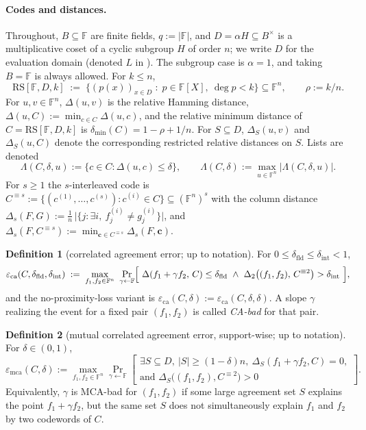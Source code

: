 \documentclass[11pt]{article}
\theoremstyle{definition}
\newtheorem{definition}[definition]{Definition}
\theoremstyle{remark}
\newcommand{\F}{\mathbb{F}}
\newcommand{\B}{B}
\newcommand{\RS}{\mathrm{RS}}
\newcommand{\eca}{\varepsilon_{\mathrm{ca}}}
\newcommand{\emca}{\varepsilon_{\mathrm{mca}}}
\newcommand{\dmin}{\delta_{\min}}
\newcommand{\dist}{\Delta}
\newcommand{\distS}{\Delta_S}
\newcommand{\Lst}{\Lambda}
\begin{document}
\paragraph{Codes and distances.} Throughout, $\B\subseteq\F$ are finite fields, $q:=|\F|$, and $D=\alpha H\subseteq\B^\times$ is a multiplicative coset of a cyclic subgroup $H$ of order $n$; we write $D$ for the evaluation domain (denoted $L$ in \cite{ABF26}). The subgroup case is $\alpha=1$, and taking $\B=\F$ is always allowed. For $k\le n$,
\[
\RS[\F,D,k]\;:=\;\bigl\{(p(x))_{x\in D}\;:\;p\in\F[X],\ \deg p<k\bigr\}\subseteq\F^n,
\qquad \rho:=k/n .
\]
For $u,v\in\F^n$, $\dist(u,v)$ is the relative Hamming distance, $\dist(u,C):=\min_{c\in C}\dist(u,c)$, and the relative minimum distance of $C=\RS[\F,D,k]$ is $\dmin(C)=1-\rho+1/n$. For $S\subseteq D$, $\distS(u,v)$ and $\distS(u,C)$ denote the corresponding restricted relative distances on $S$. Lists are denoted
\[
\Lst(C,\delta,u):=\{c\in C:\dist(u,c)\le\delta\},\qquad \Lst(C,\delta):=\max_{u\in\F^n}|\Lst(C,\delta,u)| .
\]
For $s\ge1$ the $s$-interleaved code is $C^{\equiv s}:=\{(c^{(1)},\dots,c^{(s)}):c^{(i)}\in C\}\subseteq(\F^n)^s$ with the column distance $\dist_s(F,G):=\frac1n\,\bigl|\{j:\exists i,\ f^{(i)}_j\ne g^{(i)}_j\}\bigr|$, and $\dist_s(F,C^{\equiv s}):=\min_{\mathbf c\in C^{\equiv s}}\dist_s(F,\mathbf c)$.

\begin{definition}[correlated agreement error; {\cite[Def.~4.1]{ABF26}} up to notation]\label{def:ca}
For $0\le\delta_{\mathrm{fld}}\le\delta_{\mathrm{int}}<1$,
\[
\eca(C,\delta_{\mathrm{fld}},\delta_{\mathrm{int}})\;:=\;\max_{f_1,f_2\in\F^n}\ \Pr_{\gamma\leftarrow\F}\Bigl[\ \dist(f_1+\gamma f_2,\,C)\le\delta_{\mathrm{fld}}\ \wedge\ \dist_2\bigl((f_1,f_2),\,C^{\equiv2}\bigr)>\delta_{\mathrm{int}}\ \Bigr],
\]
and the no-proximity-loss variant is $\eca(C,\delta):=\eca(C,\delta,\delta)$. A slope $\gamma$ realizing the event for a fixed pair $(f_1,f_2)$ is called \emph{CA-bad} for that pair.
\end{definition}

\begin{definition}[mutual correlated agreement error, support-wise; {\cite[Def.~4.3]{ABF26}} up to notation]\label{def:mca}
For $\delta\in(0,1)$,
\[
\emca(C,\delta):=\max_{f_1,f_2\in\F^n}\Pr_{\gamma\leftarrow\F}\left[
\begin{array}{l}
\exists S\subseteq D,\ |S|\ge(1-\delta)n,\ \distS(f_1+\gamma f_2,C)=0,\\[2pt]
\text{and }\distS\bigl((f_1,f_2),C^{\equiv2}\bigr)>0
\end{array}
\right].
\]
Equivalently, $\gamma$ is MCA-bad for $(f_1,f_2)$ if some large agreement set $S$ explains the point $f_1+\gamma f_2$, but the same set $S$ does not simultaneously explain $f_1$ and $f_2$ by two codewords of $C$.
\end{definition}
\end{document}
